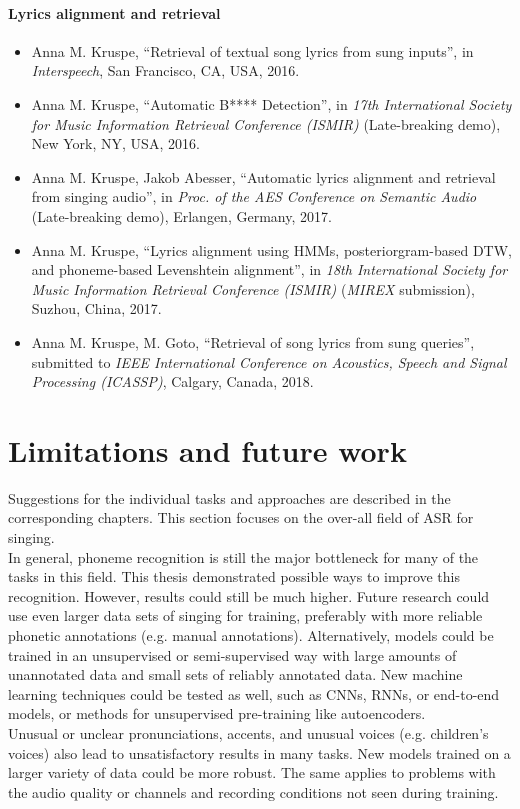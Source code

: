 \paragraph{Lyrics alignment and retrieval}
\begin{itemize}
\item Anna M. Kruspe, ``Retrieval of textual song lyrics from sung inputs'', in \textit{Interspeech}, San Francisco, CA, USA, 2016.
\item Anna M. Kruspe, ``Automatic B**** Detection'', in \textit{17th International Society for Music Information Retrieval Conference (ISMIR)} (Late-breaking demo), New York, NY, USA, 2016.
\item Anna M. Kruspe, Jakob Abesser, ``Automatic lyrics alignment and retrieval from singing audio'', in \textit{Proc. of the AES Conference on Semantic Audio} (Late-breaking demo), Erlangen, Germany, 2017.
\item Anna M. Kruspe, ``Lyrics alignment using HMMs, posteriorgram-based DTW, and phoneme-based Levenshtein alignment'', in \textit{18th International Society for Music Information Retrieval Conference (ISMIR)} (\textit{MIREX} submission), Suzhou, China, 2017.
\item Anna M. Kruspe, M. Goto, ``Retrieval of song lyrics from sung queries'', submitted to \textit{IEEE International Conference on Acoustics, Speech and Signal Processing (ICASSP)}, Calgary, Canada, 2018.
\end{itemize}

\section{Limitations and future work}

Suggestions for the individual tasks and approaches are described in the corresponding chapters. This section focuses on the over-all field of ASR for singing.\\
In general, phoneme recognition is still the major bottleneck for many of the tasks in this field. This thesis demonstrated possible ways to improve this recognition. However, results could still be much higher. Future research could use even larger data sets of singing for training, preferably with more reliable phonetic annotations (e.g. manual annotations). Alternatively, models could be trained in an unsupervised or semi-supervised way with large amounts of unannotated data and small sets of reliably annotated data. New machine learning techniques could be tested as well, such as CNNs, RNNs, or end-to-end models, or methods for unsupervised pre-training like autoencoders.\\
Unusual or unclear pronunciations, accents, and unusual voices (e.g. children's voices) also lead to unsatisfactory results in many tasks. New models trained on a larger variety of data could be more robust. The same applies to problems with the audio quality or channels and recording conditions not seen during training.\\

